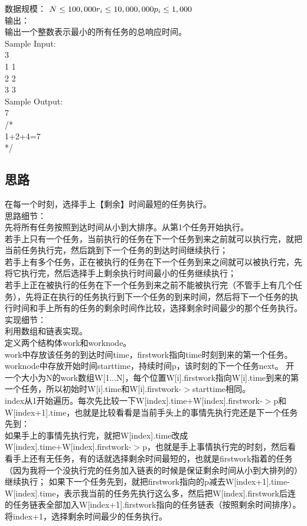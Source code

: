 \documentclass[UTF8]{ctexart}
\begin{document}
数据规模：
$N\leq 100,000\\
r_i\leq 10,000,000\\
p_i\leq 1,000$\\

输出：\\
输出一个整数表示最小的所有任务的总响应时间。\\

Sample Input:\\
3\\
1 1\\
2 2\\
3 3\\

Sample Output:\\
7\\
/*\\
1+2+4=7\\
*/\\

\subsection{思路}
在每一个时刻，选择手上【剩余】时间最短的任务执行。\\

思路细节：\\
先将所有任务按照到达时间从小到大排序。从第1个任务开始执行。\\
若手上只有一个任务，当前执行的任务在下一个任务到来之前就可以执行完，就把当前任务执行完，然后跳到下一个任务的到达时间继续执行；\\若手上有多个任务，正在被执行的任务在下一个任务到来之间就可以被执行完，先将它执行完，然后选择手上剩余执行时间最小的任务继续执行；\\若手上正在被执行的任务在下一个任务到来之前不能被执行完（不管手上有几个任务），先将正在执行的任务执行到下一个任务的到来时间，然后将下一个任务的执行时间和手上所有的任务的剩余时间作比较，选择剩余时间最少的那个任务执行。\\

实现细节：\\
利用数组和链表实现。\\
定义两个结构体work和worknode。\\
work中存放该任务的到达时间time，firstwork指向time时刻到来的第一个任务。
worknode中存放开始时间starttime，持续时间p，该时刻的下一个任务next。
开一个大小为N的work数组W[1...N]，每个位置W[i].firstwork指向W[i].time到来的第一个任务，所以初始时W[i].time和W[i].firstwork-$>$starttime相同。\\
index从1开始遍历。每次先比较一下W[index].time+W[index].firstwork-$>$p和W[index+1].time，也就是比较看看是当前手头上的事情先执行完还是下一个任务先到：\\
如果手上的事情先执行完，就把W[index].time改成W[index].time+W[index].firstwork-$>$p，也就是手上事情执行完的时刻，然后看看手上还有无任务，有的话就选择剩余时间最短的，也就是firstwork指着的任务（因为我将一个没执行完的任务加入链表的时候是保证剩余时间从小到大排列的）继续执行；
如果下一个任务先到，就把firstwork指向的p减去W[index+1].time-W[index].time，表示我当前的任务先执行这么多，然后把W[index].firstwork后连的任务链表全部加入W[index+1].firstwork指向的任务链表（按照剩余时间排序）。将index+1，选择剩余时间最少的任务执行。
\end{document}
